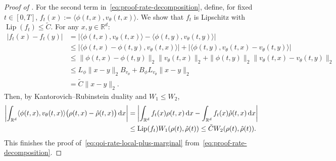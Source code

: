 \documentclass[oneside,11pt]{article}
\theoremstyle{remark}
\begin{document}
\begin{proof}[Proof of ]
For the second term in~\eqref{eq:proof-rate-decomposition}, define, for fixed
$t \in [0,T]$,
$
    f_t(x)
    :=
    \langle \phi(t, x),v_\theta(t,x)\rangle .
$
We show that $f_t$ is Lipschitz with $\operatorname{Lip}(f_t)\leq \tilde{C}$. For any $x,y\in\mathbb R^d$:
\begin{align*}
|f_t(x)-f_t(y)|
&=
\left|
\langle \phi(t,x),v_\theta(t,x)\rangle
-
\langle \phi(t, y),v_\theta(t,y)\rangle
\right|
\\
&\leq
\left|
\langle \phi(t, x)-\phi(t,y),v_\theta(t,x)\rangle
\right|
+
\left|
\langle \phi(t,y),v_\theta(t,x)-v_\theta(t,y)\rangle
\right|
\\
&\leq
\|\phi(t,x)-\phi(t,y)\|_2
\|v_\theta(t,x)\|_2
+
\|\phi(t,y)\|_2
\|v_\theta(t,x)-v_\theta(t,y)\|_2
\\
&\leq
L_{\phi}\|x-y\|_2 B_{v_\theta}
+
B_\phi L_{v_\theta}\|x-y\|_2
\\
&=
\tilde{C}\|x-y\|_2 .
\end{align*}
Then, by Kantorovich--Rubinstein duality and $W_1\leq W_2$,
\begin{align*}
\left|
    \int_{\mathbb R^d}
    \langle \phi(t, x),v_\theta(t,x)\rangle
    \big(\rho(t,x)-\hat{\rho}(t,x)\big)\,\mathrm dx
\right|
&=
\left|
    \int_{\mathbb R^d} f_t(x)\rho(t,x)\,\mathrm dx
    -
    \int_{\mathbb R^d} f_t(x)\hat{\rho}(t,x)\,\mathrm dx
\right|
\notag \\
&\leq
\operatorname{Lip}(f_t) W_1(\rho(t),\hat{\rho}(t))
\leq
\tilde{C} W_2(\rho(t),\hat{\rho}(t)).
\end{align*}
This finishes the proof of~\eqref{eq:qoi-rate-local-plus-marginal} from~\eqref{eq:proof-rate-decomposition}.











































\end{proof}
\end{document}
